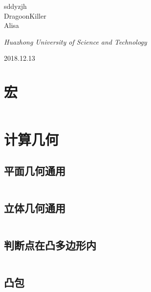 \documentclass[UTF8]{ctexart}
\begin{document}
\begin{titlepage}
	{\protect sddyzjh \\ DragoonKiller \\ Alisa \\} %

	\vspace{0.5\baselineskip} %

	\textit{Huazhong University of Science and Technology} %

	\vfill %


\date{\today}

	2018.12.13 %
\end{titlepage}
\setcounter{secnumdepth}{0}

\tableofcontents

\newpage
{}

\section{宏}
\inputminted{cpp}{others/template.cpp}

\section{计算几何}

\subsection{平面几何通用}
\inputminted{cpp}{calcgeometry/平面几何通用.cpp}

\subsection{立体几何通用}
\inputminted{cpp}{calcgeometry/立体几何通用.cpp}

\subsection{判断点在凸多边形内}
\inputminted{cpp}{calcgeometry/判断点在凸多边形内.cpp}

\subsection{凸包}
\inputminted{cpp}{calcgeometry/凸包.cpp}
\end{document}
